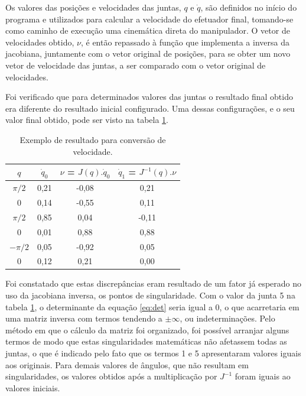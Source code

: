 Os valores das posições e velocidades das juntas, $q$ e $\dot{q}$, são definidos no início do programa
e utilizados para calcular a velocidade do efetuador final, tomando-se como caminho de execução uma 
cinemática direta do manipulador. O vetor de velocidades obtido, $\nu$, é então repassado à função
que implementa a inversa da jacobiana, juntamente com o vetor original de posições, para se obter um 
novo vetor de velocidade das juntas, a ser comparado com o vetor original de velocidades.

Foi verificado que para determinados valores das juntas o resultado final obtido era diferente do resultado
inicial configurado. Uma dessas configurações, e o seu valor final obtido, pode ser visto na tabela 
\ref{tab:res-jacobiana}.

\begin{table}[ht]
    \begin{centering}    
    
    \caption{Exemplo de resultado para conversão de velocidade.}
    
    \begin{tabular}{|c|c|c|c|}
        \hline
        $q$ & $\dot{q}_0$ & $\nu$ = $J(q).\dot{q}_0$ & $\dot{q}_1$ = $J^{-1}(q).\nu$ \tabularnewline
        \hline
        \hline
        $\pi/2$ & 0,21 & -0,08 & 0,21  \tabularnewline
        \hline
        $0$ & 0,14 & -0,55 & 0,11 \tabularnewline
        \hline
        $\pi/2$ & 0,85 & 0,04 & -0,11 \tabularnewline
        \hline
        $0$ & 0,01 & 0,88 & 0,88 \tabularnewline
        \hline
        $-\pi/2$ & 0,05 & -0,92 & 0,05  \tabularnewline
        \hline
        $0$ & 0,12 & 0,21 & 0,00 \tabularnewline
        \hline
    \end{tabular}

\label{tab:res-jacobiana}
    
\par\end{centering}
\end{table}

Foi constatado que estas discrepâncias eram resultado de um fator já esperado no uso
da jacobiana inversa, os pontos de singularidade. Com o valor da junta 5 na tabela
\ref{tab:res-jacobiana}, o determinante da equação \ref{eq:det} seria igual a 0, o que 
acarretaria em uma matriz inversa com termos tendendo a $\pm\infty$, ou indeterminações.
Pelo método em que o cálculo da matriz foi organizado, foi possível arranjar alguns termos de 
modo que estas singularidades matemáticas não afetassem todas as juntas, o que é indicado pelo
fato que os termos 1 e 5 apresentaram valores iguais aos originais.
Para demais valores de ângulos, que não resultam em singularidades, os valores obtidos após
a multiplicação por $J^{-1}$ foram iguais ao valores iniciais.

